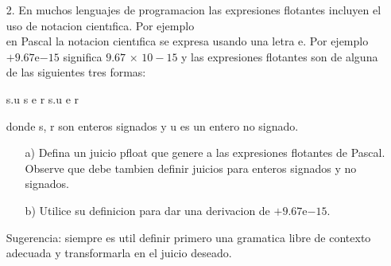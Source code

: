 \documentclass{article}
\begin{document}
\begin{itemize}
\begin{itemize}
                Si w = "V", entonces $\exists$u $\in$ o, z (w = V u).\\

                Paso de la inducción: Supongamos que tenemos una cadena w que es un nombre válido de variable en el lenguaje Zoo, es decir, ozv(w) es verdadero. Queremos demostrar que para cualquier cadena más compleja w\' que se pueda formar al agregar un carácter \'o\' o \'z\' al final de w, la propiedad sigue siendo verdadera. Entonces, consideremos dos casos:\\

                Caso 1: Si agregamos \'o\' al final de w para formar w\', entonces podemos decir que w\' = w \'o\'. Dado que w ya es un nombre válido de variable, podemos tomar u igual a w y todavía se cumplirá la propiedad:\\

                Si w\' = w \'o\', entonces $\exists$u $\in$ o, z (w\' = V u).\\

                Caso 2: Podemos decir que w' = w 'z' si agregamos "z" al final de w para formar w'. Dado que w ya es un nombre válido de variable, podemos tomar u igual a w y aún se cumplirá la propiedad:\\ 

                Si w\' = w \'z\', entonces $\exists$u $\in$ o, z (w\' = V u).\\

                En ambos casos demostramos que si la propiedad es verdadera para w, también es verdadera para w', donde w' se construye agregando "o" o "z" al final de w.\\

                Por lo tanto la propiedad es verdadera para todas las cadenas w, que son nombres de variable válidos en el lenguaje Zoo.
            \end{itemize} 
        \item[2.] En muchos lenguajes de programacion las expresiones flotantes incluyen el uso de notacion cientıfica. Por ejemplo\\
        en Pascal la notacion cientıfica se expresa usando una letra e. Por ejemplo $+9.67$e$-15$ significa $9.67$ × $10-15$ y las expresiones flotantes son de alguna de las siguientes tres formas:
            \begin{center}
                s.u s e r s.u e r
            \end{center}
        donde s, r son enteros signados y u es un entero no signado.
            \begin{itemize}
                \item[a)] Defina un juicio pfloat que genere a las expresiones flotantes de Pascal. Observe que debe tambien definir juicios para enteros signados y no signados.
                \item[b)] Utilice su definicion para dar una derivacion de $+9.67$e$-15$.
            \end{itemize}
        Sugerencia: siempre es util definir primero una gramatica libre de contexto adecuada y transformarla en el juicio deseado.


\end{itemize}
\end{document}
